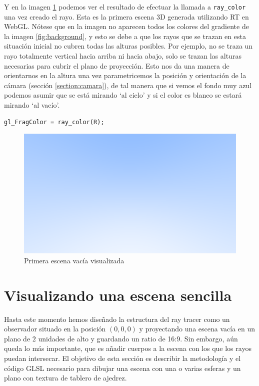 Y en la imagen \ref{fig:first-render} podemos ver el resultado de efectuar la llamada a \verb|ray_color| una vez creado el rayo. Esta es la primera escena 3D generada utilizando RT en WebGL. Nótese que en la imagen no aparecen todos los colores del gradiente de la imagen \ref{fig:background}, y esto se debe a que los rayos que se trazan en esta situación inicial no cubren todas las alturas posibles. Por ejemplo, no se traza un rayo totalmente vertical hacia arriba ni hacia abajo, solo se trazan las alturas necesarias para cubrir el plano de proyección. Esto nos da una manera de orientarnos en la altura una vez parametricemos la posición y orientación de la cámara (sección \ref{section:camara}), de tal manera que si vemos el fondo muy azul podemos asumir que se está mirando `al cielo' y si el color es blanco se estará mirando `al vacío'. 

\begin{lstlisting}
gl_FragColor = ray_color(R);
\end{lstlisting}

\begin{figure} [ht]
    \centering
    \includegraphics[scale = 0.35]{img/C7/first-render.png}
    \caption{Primera escena vacía visualizada}
    \label{fig:first-render}
\end{figure}

\section{Visualizando una escena sencilla}
\label{section:escena}

Hasta este momento hemos diseñado la estructura del ray tracer como un observador situado en la posición $(0, 0,0)$ y proyectando una escena vacía en un plano de $2$ unidades de alto y guardando un ratio de 16:9. Sin embargo, aún queda lo más importante, que es añadir cuerpos a la escena con los que los rayos puedan intersecar. El objetivo de esta sección es describir la metodología y el código GLSL necesario para dibujar una escena con una o varias esferas y un plano con textura de tablero de ajedrez.

